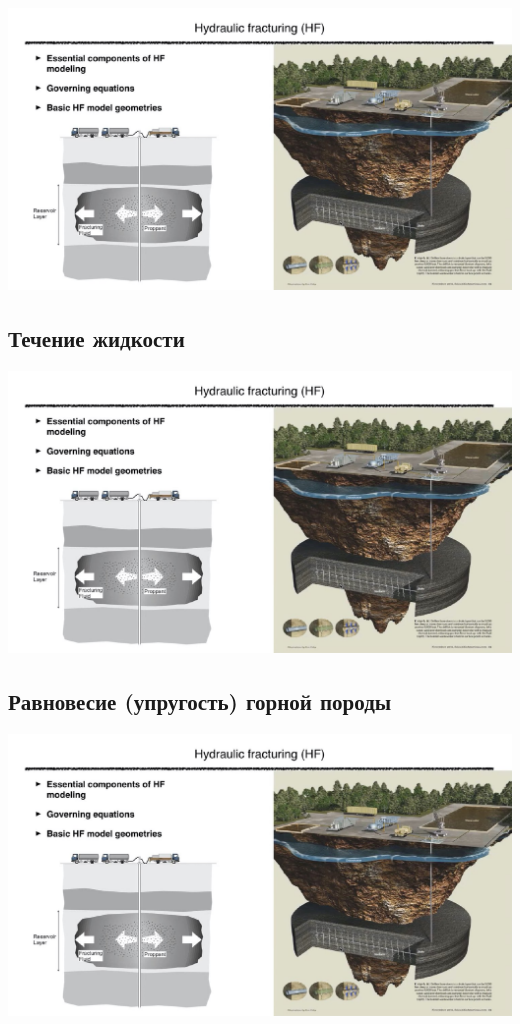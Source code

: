 \documentclass[main.tex]{subfiles}
\begin{document}
\includegraphics[width=\textwidth, page=5]{HF_slides.pdf}

\subsection{Течение жидкости}

\includegraphics[width=\textwidth, page=6]{HF_slides.pdf}

\subsection{Равновесие (упругость) горной породы}

\includegraphics[width=\textwidth, page=7]{HF_slides.pdf}
\end{document}
